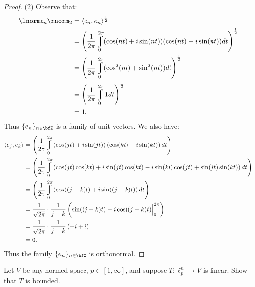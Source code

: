\documentclass[11pt,twoside,openany]{memoir}
\renewcommand{\int}{\varint}
\begin{document}
\begin{proof}
            (2) Observe that:
                \begin{equation*}
                \begin{split}
                    \lnorm e_n \rnorm_2 
                    & = \langle e_n,e_n \rangle^\frac{1}{2} \\
                    & = \left( \frac{1}{2\pi} \int_0^{2\pi}(\cos(nt) + i\sin(nt))(\cos(nt)-i\sin(nt))dt \right)^\frac{1}{2} \\
                    & = \left( \frac{1}{2\pi}\int_0^{2\pi}(\cos^2(nt) + \sin^2(nt))dt \right)^\frac{1}{2} \\
                    & = \left( \frac{1}{2\pi} \int_0^{2\pi}1 dt \right)^\frac{1}{2} \\
                    & = 1.
                \end{split}
                \end{equation*}
            Thus $\{e_n\}_{n \in \bfZ}$ is a family of unit vectors. We also have:
                \begin{equation*}
                \begin{split}
                    \langle e_j,e_k \rangle
                    & = \left( \frac{1}{2\pi} \int_0^{2\pi} \left( \cos(jt) + i\sin(jt) \right)\left( \cos(kt) + i\sin(kt) \right)dt \right) \\
                    & = \left( \frac{1}{2\pi} \int_0^{2\pi} \left( \cos(jt)\cos(kt) + i\sin(jt)\cos(kt) - i\sin(kt)\cos(jt) + \sin(jt)\sin(kt) \right) dt \right) \\
                    & = \left( \frac{1}{2\pi} \int_0^{2\pi} \left( \cos((j-k)t) + i\sin((j-k)t) \right) dt \right) \\
                    & = \frac{1}{\sqrt{2\pi}} \cdot \frac{1}{j-k} \left( \sin((j-k)t) - i \cos((j-k)t) \Big|_0^{2\pi}\right) \\
                    & = \frac{1}{\sqrt{2\pi}} \cdot \frac{1}{j-k} \left( -i + i \right) \\
                    & = 0.
                \end{split}
                \end{equation*}
            Thus the family $\{e_n\}_{n \in \bfZ}$ is orthonormal.
        \end{proof}
    \newpage
    \begin{exercise}
        Let $V$ be any normed space, $p \in [1,\infty]$, and suppose $T: \ell_p^n \rightarrow V$ is linear. Show that $T$ is bounded.
    \end{exercise}
\end{document}
